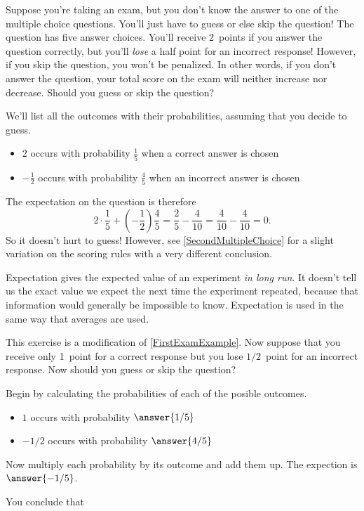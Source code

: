 \documentclass[number]{ximera}
\begin{document}
\begin{example}\label{FirstExamExample}
Suppose you're taking an exam, but you
don't know the answer to one of the
multiple choice questions. You'll just have to guess or
else skip the question!
The question has five answer choices. You'll receive
$2$~points if you answer the question correctly,
but you'll {\em lose}
a half point for an incorrect response!
However, if you skip the question, you won't be penalized.
In other words, if you don't answer the question, your total
score on the exam will neither increase nor decrease.
Should you guess or skip the question?

We'll list all the outcomes with their probabilities,
assuming that you decide to guess.
\begin{itemize}
\item $2$ occurs with probability $\frac{1}{5}$ when
a correct answer is chosen
\item $-\frac{1}{2}$ occurs with probability $\frac{4}{5}$
when an incorrect answer is chosen
\end{itemize}
The expectation on the question is therefore
\[2\cdot\frac{1}{5}+\left(-\frac{1}{2}\right)\frac{4}{5}
=\frac{2}{5}-\frac{4}{10}
=\frac{4}{10}-\frac{4}{10}
=0.\]
So it doesn't hurt to guess!
However, see \autoref{SecondMultipleChoice} for a slight
variation on the scoring rules
with a very different conclusion.
\end{example}

\begin{remark}
Expectation gives
the expected value of an experiment {\em in long run}.
It doesn't tell us the exact value we expect
the next time the experiment repeated, because that
information would generally be impossible to know.
Expectation is used in the same way that averages are used.
\end{remark}

\begin{exercise}
This exercise is a modification of \autoref{FirstExamExample}.
Now suppose that you receive only 1~point
for a correct response
but you lose $1/2$~point for an incorrect response.
Now should you guess or skip the question?

Begin by calculating the probabilities of each of the posible outcomes.
\begin{itemize}
\item $1$ occurs with probability $\answer{1/5}$
\item $-1/2$ occurs with probability $\answer{4/5}$
\end{itemize}

Now multiply each probability by its outcome and add them up.
The expection is $\answer{-1/5}$.

You conclude that
\begin{multipleChoice}
\end{multipleChoice}
\end{exercise}
\end{document}
